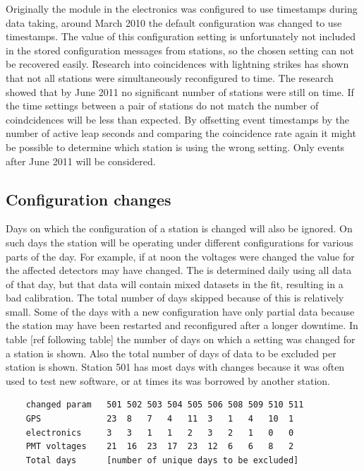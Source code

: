 Originally the \gps module in the \hisparc electronics was configured to use \utc timestamps during data taking, around March 2010 the default configuration was changed to use \gps timestamps. The value of this configuration setting is unfortunately not included in the stored configuration messages from stations, so the chosen setting can not be recovered easily. Research into coincidences with lightning strikes has shown that not all \hisparc stations were simultaneously reconfigured to \gps time. The research showed that by June 2011 no significant number of stations were still on \utc time. If the time settings between a pair of stations do not match the number of coindcidences will be less than expected. By offsetting event timestamps by the number of active leap seconds and comparing the coincidence rate again it might be possible to determine which station is using the wrong setting. Only events after June 2011 will be considered.


\subsection{Configuration changes}

Days on which the configuration of a station is changed will also be ignored. On such days the station will be operating under different configurations for various parts of the day. For example, if at noon the \pmt voltages were changed the \mpv value for the affected detectors may have changed. The \mpv is determined daily using all data of that day, but that data will contain mixed datasets in the fit, resulting in a bad calibration. The total number of days skipped because of this is relatively small. Some of the days with a new configuration have only partial data because the station may have been restarted and reconfigured after a longer downtime. In table [ref following table] the number of days on which a setting was changed for a station is shown. Also the total number of days of data to be excluded per station is shown. Station 501 has most days with changes because it was often used to test new software, or at times its \gps was borrowed by another station.

\begin{verbatim}
    changed param   501 502 503 504 505 506 508 509 510 511
    GPS             23  8   7   4   11  3   1   4   10  1
    electronics     3   3   1   1   2   3   2   1   0   0
    PMT voltages    21  16  23  17  23  12  6   6   8   2
    Total days      [number of unique days to be excluded]
\end{verbatim}


